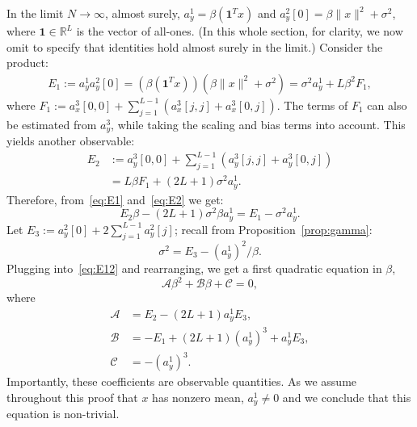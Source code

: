 \documentclass[12pt]{article}
\newcommand{\1}{\mathbf{1}}
\newcommand{\RL}{\mathbb{R}^L}
\newcommand{\one}{\mathbf{1}}
\theoremstyle{plain}
\theoremstyle{definition}
\theoremstyle{remark}
\theoremstyle{plain}
\theoremstyle{remark}
\theoremstyle{plain}
\theoremstyle{plain}
\theoremstyle{plain}
\numberwithin{equation}{section}
\begin{document}
In the limit $N \to \infty$, almost surely, $a_y^1 = \beta(\one^Tx)$ and $a_y^2[0] = \beta\|x\|^2+\sigma^2$, where $\one\in\RL$ is the vector of all-ones. (In this whole section, for clarity, we now omit to specify that identities hold almost surely in the limit.) Consider the product:
\begin{equation}\label{eq:E1}
\begin{split}
E_1 := a_y^1a_y^2[0] =  (\beta(\one^Tx))(\beta\|x\|^2+\sigma^2)  = \sigma^2a_y^1 + L\beta^2F_1,
\end{split}
\end{equation}
where $F_1 := a_x^3[0,0] + \sum_{j=1}^{L-1}(a_x^3[j,j] + a_x^3[0,j])$. 
The terms of $F_1$ can also be estimated from $a_y^3$, while taking the scaling and bias terms into account. This yields another observable:
\begin{align} 
E_2 & := a_y^3[0,0] + \sum_{j=1}^{L-1}(a_y^3[j,j] + a_y^3[0,j]) \nonumber\\
& = L\beta F_1 + (2L+1)\sigma^2a_y^1. \label{eq:E2}
\end{align}
Therefore, from~\eqref{eq:E1} and~\eqref{eq:E2} we get:
\begin{equation} \label{eq:E12}
E_2\beta -(2L+1)\sigma^2\beta a_y^1 = E_1-\sigma^2a_y^1.
\end{equation}
Let $E_3:=a_y^2[0] + 2\sum_{j = 1}^{L-1}a_y^2[j]$; recall from Proposition~\ref{prop:gamma}:
\begin{equation} \label{eq:sigma2}
\sigma^2 = E_3 - (a^1_y)^2/\beta. 
\end{equation} 
Plugging into~\eqref{eq:E12} and rearranging, we get a first quadratic equation in $\beta$,
\begin{equation} \label{eq:quad1}
\mathcal{A}\beta^2 + \mathcal{B}\beta + \mathcal{C} = 0,
\end{equation}
where 
\begin{align*}
\mathcal{A} &= E_2 - (2L+1)a_y^1E_3, \\ 
\mathcal{B} &= -E_1 + (2L+1)(a_y^1)^3 + a_y^1E_3  , \\
\mathcal{C} &= -(a_y^1)^3.
\end{align*}
Importantly, these coefficients are observable quantities. As we assume throughout this proof that $x$ has nonzero mean, $a_y^1 \neq 0$ and we conclude that this equation is non-trivial.
\end{document}
